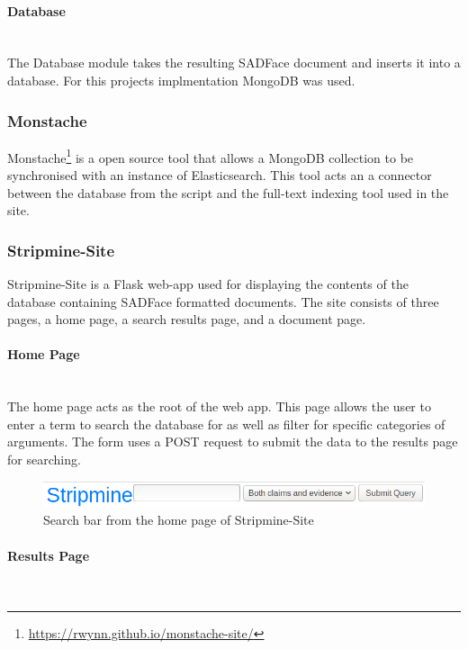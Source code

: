 \documentclass[12pt,a4paper]{article}
\begin{document}
\paragraph{Database}\mbox{}\\

The Database module takes the resulting SADFace document and inserts it into a database. For this projects implmentation MongoDB was used.

\subsubsection{Monstache}

Monstache\footnote{\url{https://rwynn.github.io/monstache-site/}} is a open source tool that allows a MongoDB collection to be synchronised with an instance of Elasticsearch. This tool acts an a connector between the database from the script and the full-text indexing tool used in the site. 

\subsubsection{Stripmine-Site}

Stripmine-Site is a Flask web-app used for displaying the contents of the database containing SADFace formatted documents. The site consists of three pages, a home page, a search results page, and a document page.

\paragraph{Home Page}\mbox{}\\

The home page acts as the root of the web app. This page allows the user to enter a term to search the database for as well as filter for specific categories of arguments. The form uses a POST request to submit the data to the results page for searching.

\begin{figure}[H]
    \centering
    \includegraphics[scale=0.5]{Report/graphics/home.png}
    \caption{Search bar from the home page of Stripmine-Site}
    \label{fig:home}
\end{figure}

\paragraph{Results Page}\mbox{}\\
\end{document}
